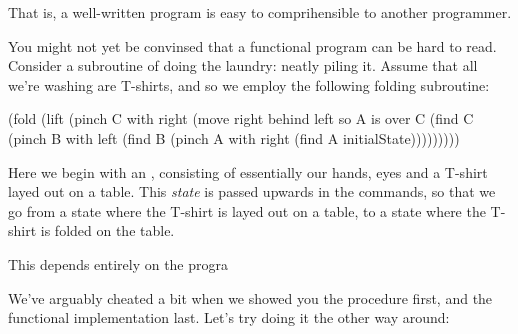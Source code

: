 That is, a well-written program is easy to comprihensible to another
programmer.

You might not yet be convinsed that a functional program can be hard to read.
Consider a subroutine of doing the laundry: neatly piling it. Assume that all
we're washing are T-shirts, and so we employ the following folding subroutine:

\begin{code}
(fold
  (lift
    (pinch C with right
      (move right behind left so A is over C
        (find C
          (pinch B with left
            (find B
              (pinch A with right
                (find A initialState)))))))))
\end{code}

Here we begin with an , consisting of essentially our hands,
eyes and a T-shirt layed out on a table. This \emph{state} is passed upwards in
the commands, so that we go from a state where the T-shirt is layed out on a
table, to a state where the T-shirt is folded on the table.

 This depends entirely on the progra

We've arguably cheated a bit when we showed you the procedure first, and the
functional implementation last. Let's try doing it the other way around:
